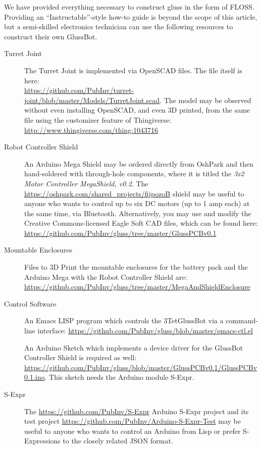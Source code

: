\documentclass[11pt]{article}
\begin{document}
We have provided everything necessary to construct gluss in the form of FLOSS. Providing an ``Instructable''-style
how-to guide is beyond the scope of this article, but a semi-skilled electronics technician can use the
following resources to construct their own GlussBot.

\begin{description}
  
\item [Turret Joint]
  The Turret Joint is implemented via OpenSCAD files. The file itself is here:\\
  \url{https://github.com/PubInv/turret-joint/blob/master/Models/TurretJoint.scad}.
       The model may be observed without even installing OpenSCAD, and even 3D printed,
       from the same file using the customizer feature of Thingiverse:\\
       \url{http://www.thingiverse.com/thing:1043716}
  
\item [Robot Controller Shield]
  An Arduino Mega Shield may be ordered directly from OshPark and then hand-soldered with through-hole components,
  where it is titled the \emph{3x2 Motor Controller MegaShield, v0.2}.
  The \url{https://oshpark.com/shared_projects/fijpozoB} shield
  may be useful to anyone who wants to control up to six DC motors (up to 1 amp each) at the same time, via Bluetooth.
  Alternatively, you may use and modify the Creative Commons-licensed Eagle Soft CAD files, which can be found here:\\
  \url{https://github.com/PubInv/gluss/tree/master/GlussPCBv0.1}

\item [Mountable Enclosures]
  Files to 3D Print the mountable enclosures for the battery pack and the Arduino Mega with the Robot Controller Shield are:\\
  \url{https://github.com/PubInv/gluss/tree/master/MegaAndShieldEnclosure}

\item [Control Software]
An Emacs LISP program which controls the 3TetGlussBot via a command-line interface:
\url{https://github.com/PubInv/gluss/blob/master/emacs-ctl.el}

An Arduino Sketch which implements a device driver for the GlussBot Controller Shield is required as well:\\
\url{https://github.com/PubInv/gluss/blob/master/GlussPCBv0.1/GlussPCBv0.1.ino}.
     This sketch needs the Arduino module S-Expr.
     
\item [S-Expr]
  The \url{https://github.com/PubInv/S-Expr} Arduino S-Expr project and its
  test project
  \url{https://github.com/PubInv/Arduino-S-Expr-Test} 
  may be useful to anyone who wants to control an Arduino from Lisp or prefer S-Expressions to the closely related JSON format.

  
\end{description}
\end{document}
